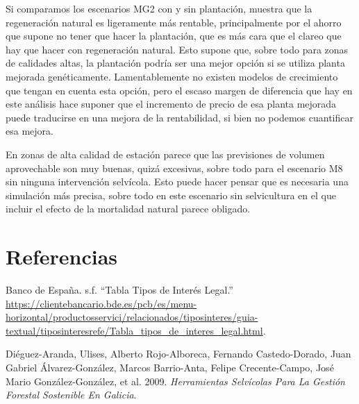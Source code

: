 \documentclass[]{article}
\begin{document}
Si comparamos los escenarios MG2 con y sin plantación, muestra que la
regeneración natural es ligeramente más rentable, principalmente por el
ahorro que supone no tener que hacer la plantación, que es más cara que
el clareo que hay que hacer con regeneración natural. Esto supone que,
sobre todo para zonas de calidades altas, la plantación podría ser una
mejor opción si se utiliza planta mejorada genéticamente.
Lamentablemente no existen modelos de crecimiento que tengan en cuenta
esta opción, pero el escaso margen de diferencia que hay en este
análisis hace suponer que el incremento de precio de esa planta mejorada
puede traducirse en una mejora de la rentabilidad, si bien no podemos
cuantificar esa mejora.

En zonas de alta calidad de estación parece que las previsiones de
volumen aprovechable son muy buenas, quizá excesivas, sobre todo para el
escenario M8 sin ninguna intervención selvícola. Esto puede hacer pensar
que es necesaria una simulación más precisa, sobre todo en este
escenario sin selvicultura en el que incluir el efecto de la mortalidad
natural parece obligado.

\section*{Referencias}\label{referencias}

\hypertarget{refs}{}
\hypertarget{ref-BE_sf}{}
Banco de España. s.f. ``Tabla Tipos de Interés Legal.''
\url{https://clientebancario.bde.es/pcb/es/menu-horizontal/productosservici/relacionados/tiposinteres/guia-textual/tiposinteresrefe/Tabla_tipos_de_interes_legal.html}.

\hypertarget{ref-Dieguez2009}{}
Diéguez-Aranda, Ulises, Alberto Rojo-Alboreca, Fernando Castedo-Dorado,
Juan Gabriel Álvarez-González, Marcos Barrio-Anta, Felipe
Crecente-Campo, José Mario González-González, et al. 2009.
\emph{Herramientas Selvícolas Para La Gestión Forestal Sostenible En
Galicia}.
\end{document}
